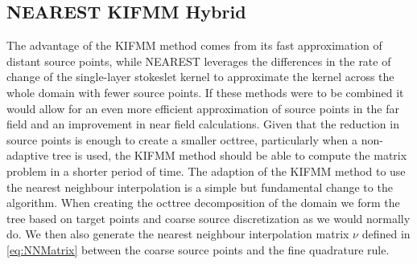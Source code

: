 \FloatBarrier

\subsection{NEAREST KIFMM Hybrid} \label{sec:Hybrid}
The advantage of the KIFMM method comes from its fast approximation of distant source points, while NEAREST leverages the differences in the rate of change of the single-layer stokeslet kernel to approximate the kernel across the whole domain with fewer source points. If these methods were to be combined it would allow for an even more efficient approximation of source points in the far field and an improvement in near field calculations. Given that the reduction in source points is enough to create a smaller octtree, particularly when a non-adaptive tree is used, the KIFMM method should be able to compute the matrix problem in a shorter period of time. The adaption of the KIFMM method to use the nearest neighbour interpolation is a simple but fundamental change to the algorithm. When creating the octtree decomposition of the domain we form the tree based on target points and coarse source discretization as we would normally do. We then also generate the nearest neighbour interpolation matrix $\nu$ defined in \cref{eq:NNMatrix} between the coarse source points and the fine quadrature rule.  

